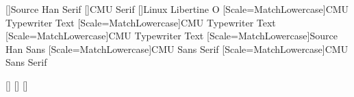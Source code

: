 \usepackage[russian,croatian,japanese,provide*=*]{babel}
[]{Source Han Serif}
[]{CMU Serif}
[]{Linux Libertine O}
[Scale=MatchLowercase]{CMU Typewriter Text}
[Scale=MatchLowercase]{CMU Typewriter Text}
[Scale=MatchLowercase]{CMU Typewriter Text}
[Scale=MatchLowercase]{Source Han Sans}
[Scale=MatchLowercase]{CMU Sans Serif}
[Scale=MatchLowercase]{CMU Sans Serif}
\usepackage{xeCJK}
[]
[]
[]
